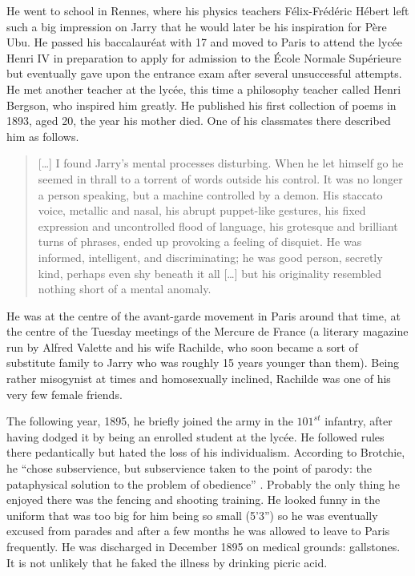 He went to school in Rennes, where his physics teachers Félix-Frédéric Hébert left such a big impression on Jarry that he would later be his inspiration for Père Ubu. He passed his baccalauréat with 17 and moved to Paris to attend the lycée Henri IV in preparation to apply for admission to the École Normale Supérieure but eventually gave upon the entrance exam after several unsuccessful attempts. He met another teacher at the lycée, this time a philosophy teacher called Henri Bergson, who inspired him greatly. He published his first collection of poems in 1893, aged 20, the year his mother died. One of his classmates there described him as follows.

\begin{quotation}
  [\ldots] I found Jarry's mental processes disturbing. When he let himself go he seemed in thrall to a torrent of words outside his control. It was no longer a person speaking, but a machine controlled by a demon. His staccato voice, metallic and nasal, his abrupt puppet-like gestures, his fixed expression and uncontrolled flood of language, his grotesque and brilliant turns of phrases, ended up provoking a feeling of disquiet. He was informed, intelligent, and discriminating; he was good person, secretly kind, perhaps even shy beneath it all [\ldots] but his originality resembled nothing short of a mental anomaly. 
\end{quotation}

He was at the centre of the avant-garde movement in Paris around that time, at the centre of the Tuesday meetings of the Mercure de France (a literary magazine run by Alfred Valette and his wife Rachilde, who soon became a sort of substitute family to Jarry who was roughly 15 years younger than them). Being rather misogynist at times and homosexually inclined, Rachilde was one of his very few female friends.

The following year, 1895, he briefly joined the army in the $101^{st}$ infantry, after having dodged it by being an enrolled student at the lycée. He followed rules there pedantically but hated the loss of his individualism. According to Brotchie, he ``chose subservience, but subservience taken to the point of parody: the pataphysical solution to the problem of obedience'' \autocite*{Brotchie2011a}. Probably the only thing he enjoyed there was the fencing and shooting training. He looked funny in the uniform that was too big for him being so small (5'3'') so he was eventually excused from parades and after a few months he was allowed to leave to Paris frequently. He was discharged in December 1895 on medical grounds: gallstones. It is not unlikely that he faked the illness by drinking picric acid.

